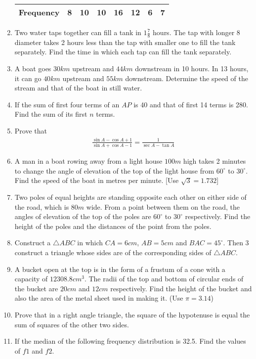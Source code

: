 \documentclass[12pt]{article}
\begin{document}
\begin{enumerate}
\begin{tabular}{|c|c|c|c|c|c|c|c|}
    Frequency& 8 & 10 & 10 & 16 & 12 & 6 & 7 \\
    \hline
  \end{tabular}
  
\item Two water taps together can fill a tank in $1\frac{7}{8}$
hours. The tap with longer 8 diameter takes 2 hours less than the tap with smaller one to fill the tank separately. Find the time in which each tap can fill the tank separately.
\item A boat goes $30 km$ upstream and $44 km$ downstream in 10 hours. In 13 hours, it can go $40 km$ upstream and $55 km$ downstream. Determine the speed of the stream and that of the boat in still water.
\item If the sum of first four terms of an $AP$ is 40 and that of first 14 terms is 280. Find the sum of its first $n$ terms.
\item Prove that \begin{align*} \frac{\sin A-\cos A+1}{\sin A+ \cos A-1}  =\frac{1}{\sec A-\tan A}\end{align*}
\item A man in a boat rowing away from a light house $100 m$ high takes 2 minutes to change the angle of elevation of the top of the light house from $60^\circ$ to $30^\circ$. Find the speed of the boat in metres per minute. [Use $\sqrt{3}=1.732$]
\item Two poles of equal heights are standing opposite each other on either side of the road, which is $80 m$ wide. From a point between them on the road, the angles of elevation of the top of the poles are $60^\circ$ to $30^\circ$ respectively. Find the height of the poles and the distances of the point from the poles.
\item Construct a $\triangle ABC$ in which $CA = 6 cm$, $AB = 5 cm$ and $BAC= 45^\circ$. Then 3 construct a triangle whose sides are of the corresponding sides of $\triangle ABC$.
\item A bucket open at the top is in the form of a frustum of a cone with a capacity of $12308.8 cm^3$. The radii of the top and bottom of circular ends of the bucket are $20 cm$ and $12 cm$ respectively. Find the height of the bucket and also the area of the metal sheet used in making it. (Use  $\pi= 3.14$)
\item Prove that in a right angle triangle, the square of the hypotenuse is equal the sum of squares of the other two sides.
\item If the median of the following frequency distribution is 32.5. Find the values of $f1$ and $f2$.
  

\end{enumerate}
\end{document}
